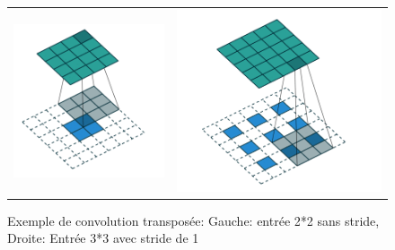 \begin{figure}
\centering
\begin{tabular}{cc}
    \includegraphics[scale=0.4]{./tex/convolution-network/cnn/transposed.png}  & \includegraphics[scale=0.4]{./tex/convolution-network/cnn/transpose2.png} \\
\end{tabular}
\caption{Exemple de convolution transposée: Gauche: entrée 2*2 sans stride, Droite: Entrée 3*3 avec stride de 1}
\label{local_fig}
\end{figure}


